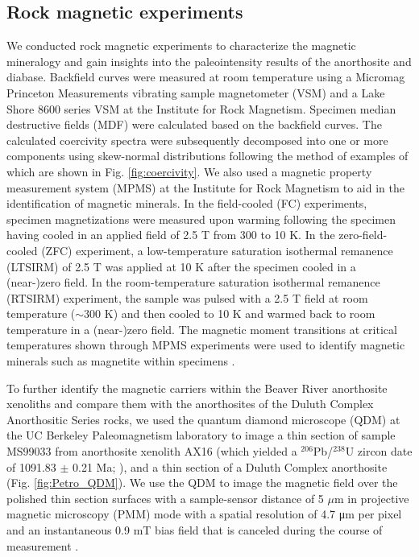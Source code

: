 \documentclass[9pt,twocolumn,twoside,lineno]{pnas-new}
\begin{document}
{\subsection*{Rock magnetic experiments}

We conducted rock magnetic experiments to characterize the magnetic mineralogy and gain insights into the paleointensity results of the anorthosite and diabase. Backfield curves were measured at room temperature using a Micromag Princeton Measurements vibrating sample magnetometer (VSM) and a Lake Shore 8600 series VSM at the Institute for Rock Magnetism. Specimen median destructive fields (MDF) were calculated based on the backfield curves. The calculated coercivity spectra were subsequently decomposed into one or more components using skew-normal distributions following the method of  \citealp{Maxbauer2016a} examples of which are shown in Fig. \ref{fig:coercivity}. We also used a magnetic property measurement system (MPMS) at the Institute for Rock Magnetism to aid in the identification of magnetic minerals. In the field-cooled (FC) experiments, specimen magnetizations were measured upon warming following the specimen having cooled in an applied field of 2.5 T from 300 to 10 K. In the zero-field-cooled (ZFC) experiment, a low-temperature saturation isothermal remanence (LTSIRM) of 2.5 T was applied at 10 K after the specimen cooled in a (near-)zero field. In the room-temperature saturation isothermal remanence (RTSIRM) experiment, the sample was pulsed with a 2.5 T field at room temperature ($\sim$300 K) and then cooled to 10 K and warmed back to room temperature in a (near-)zero field. The magnetic moment transitions at critical temperatures shown through MPMS experiments were used to identify magnetic minerals such as magnetite within specimens \cite{Feinberg2015a}. 

To further identify the magnetic carriers within the Beaver River anorthosite xenoliths and compare them with the anorthosites of the Duluth Complex Anorthositic Series rocks, we used the quantum diamond microscope (QDM) at the UC Berkeley Paleomagnetism laboratory to image a thin section of sample MS99033 from anorthosite xenolith AX16 (which yielded a $^{206}$Pb/$^{238}$U zircon date of 1091.83 $\pm$ 0.21 Ma;  \citealp{Zhang2021b}), and a thin section of a Duluth Complex anorthosite (Fig. \ref{fig:Petro_QDM}). We use the QDM to image the magnetic field over the polished thin section surfaces with a sample-sensor distance of 5 $\mu$m in projective magnetic microscopy (PMM) mode with a spatial resolution of 4.7 μm per pixel and an instantaneous 0.9 mT bias field that is canceled during the course of measurement \cite{Glenn2017a}.
}
\end{document}
